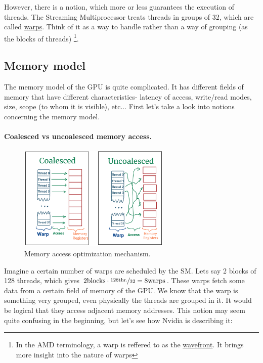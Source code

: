 \documentclass[12pt]{article}
\begin{document}
However, there is a notion, which more or less guarantees the execution of threads. The Streaming Multiprocessor
treats threads in groups of 32, which are called \underline{warps}. Think of it as a way to handle rather than 
a way of grouping (as the blocks of threads) \footnote{In the AMD terminology, a warp is reffered to as the 
\underline{wavefront}. It brings more insight into the nature of warps}.

\subsection{Memory model}
The memory model of the GPU is quite complicated. It has different fields of memory that have different characteristics-
latency of access, write/read modes, size, scope (to whom it is visible), etc... First let's take a look into 
notions concerning the memory model.
\vspace{-15pt}
\paragraph{Coalesced vs uncoalesced memory access.} 

\begin{figure}
      \vspace{-10pt}
      \centering
      \includegraphics[height=5cm]{pngs/coalesced.png}
   \caption{Memory access optimization mechanism.}
   \label{coalesced}
\end{figure}

Imagine a certain number of warps are scheduled by the SM. Lets say 2 blocks of 128 threads, which gives 
$2\text{blocks}\cdot\nicefrac{128\text{thr.}}{32} = 8 \text{warps}$. These warps fetch some data 
from a certain field of memory of the GPU. We know that the warp is something very grouped, even physically 
the threads are grouped in it. It would be logical that they access adjacent memory addresses. This notion 
may seem quite confusing in the beginning, but let's see how Nvidia is describing it\cite{center}:
\end{document}
